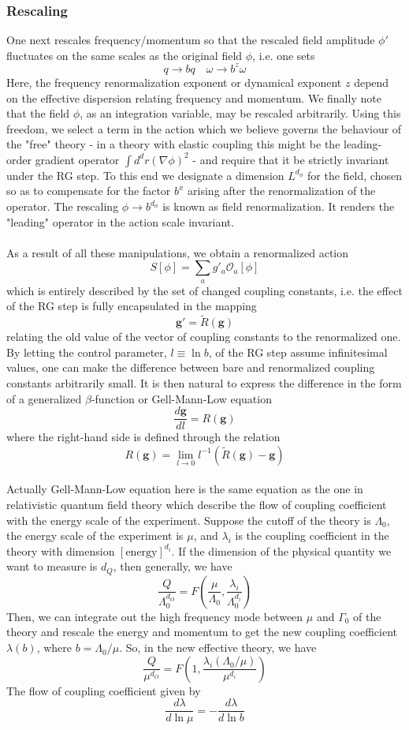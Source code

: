 \subsubsection{Rescaling}
One next rescales frequency/momentum so that the rescaled field amplitude $\phi'$ fluctuates on the same scales as the original field $\phi$, i.e. one sets
\[q \to bq \quad \omega \to b^z \omega\]
Here, the frequency renormalization exponent or dynamical exponent $z$ depend on the effective dispersion relating
frequency and momentum. 
We finally note that the field $\phi$, as an integration variable, may be rescaled arbitrarily. Using this freedom, we select a term in the action which we believe governs the behaviour of the "free" theory - in a theory with elastic coupling this might be the leading-order gradient operator $\int d^d r (\nabla \phi)^2$ - and require that it be strictly invariant under the RG step. 
To this end we designate a dimension $L^{d_{\phi}}$ for the field, chosen so as to compensate for the factor $b^x$ arising after the renormalization of the operator. The rescaling $\phi \to b^{d_{\phi}}$ is known as field renormalization. It renders the "leading" operator in the action scale invariant.
\\ \\
As a result of all these manipulations, we obtain a renormalized action
\[S[\phi] = \sum_a g'_a \mathcal{O}_a[\phi]\]
which is entirely described by the set of changed coupling constants, i.e. the effect of the RG step is fully encapsulated in the mapping
\[\bm{g}' = \tilde{R}(\bm{g})\]
relating the old value of the vector of coupling constants to the renormalized one. 
By letting the control parameter, $l \equiv \ln b$, of the RG step assume infinitesimal values, one can make the difference between bare and renormalized coupling constants
arbitrarily small. 
It is then natural to express the difference in the form of a generalized $\beta$-function or Gell-Mann-Low equation
\[\frac{d\bm{g}}{dl} = R(\bm{g})\]
where the right-hand side is defined through the relation
\[R(\bm{g}) = \lim_{l \to 0} l^{-1} (\tilde{R}(\bm{g}) - \bm{g})\]
\\
Actually Gell-Mann-Low equation here is the same equation as the one in relativistic quantum field theory which describe the flow of coupling coefficient with the energy scale of the experiment. Suppose the cutoff of the theory is $\Lambda_0$, the energy scale of the experiment is $\mu$, and $\lambda_i$ is the coupling coefficient in the theory with dimension $[\mbox{energy}] ^{d_{i}}$. If the dimension of the physical quantity we want to measure is $d_Q$, then generally, we have
\[\frac{Q}{\Lambda_0^{d_O}} = F(\frac{\mu}{\Lambda_0},\frac{\lambda_i}{\Lambda_0^{d_i}})\]
Then, we can integrate out the high frequency mode between $\mu$ and $\Gamma_0$ of the theory and rescale the energy and momentum to get the new coupling coefficient $\lambda(b)$, where $b = \Lambda_0 / \mu$. So, in the new effective theory, we have
\[\frac{Q}{\mu^{d_O}} = F(1,\frac{\lambda_i(\Lambda_0 / \mu)}{\mu^{d_i}})\]
The flow of coupling coefficient given by
\[\frac{d\lambda}{d\ln \mu} = - \frac{d\lambda}{d\ln b}\]

